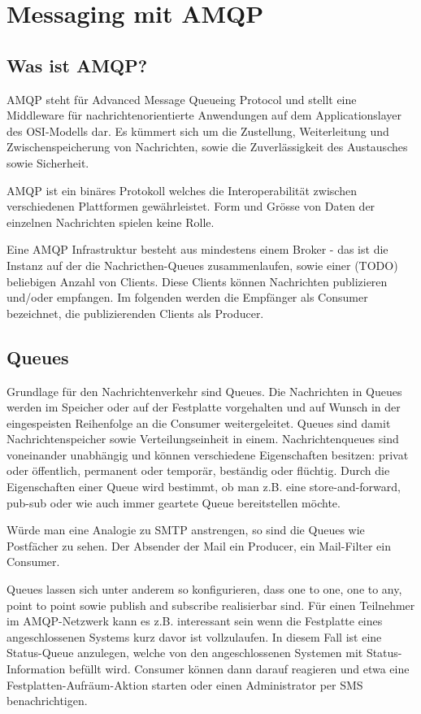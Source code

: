 \chapter{Messaging mit AMQP}

\section{Was ist AMQP?}

AMQP steht für Advanced Message Queueing Protocol und stellt eine Middleware
für nachrichtenorientierte Anwendungen auf dem Applicationslayer des OSI-Modells
dar. Es kümmert sich um die Zustellung, Weiterleitung und Zwischenspeicherung von
Nachrichten, sowie die Zuverlässigkeit des Austausches sowie Sicherheit.

AMQP ist ein binäres Protokoll welches die Interoperabilität zwischen verschiedenen
Plattformen gewährleistet. Form und Grösse von Daten der einzelnen Nachrichten
spielen keine Rolle.

Eine AMQP Infrastruktur besteht aus mindestens einem Broker - das ist die
Instanz auf der die Nachricthen-Queues zusammenlaufen, sowie einer (TODO) beliebigen
Anzahl von Clients. Diese Clients können Nachrichten publizieren und/oder
empfangen. Im folgenden werden die Empfänger als Consumer bezeichnet, die
publizierenden Clients als Producer.


\section{Queues}

Grundlage für den Nachrichtenverkehr sind Queues. Die Nachrichten in Queues
werden im Speicher oder auf der Festplatte vorgehalten und auf Wunsch in der eingespeisten
Reihenfolge an die Consumer weitergeleitet. Queues sind damit Nachrichtenspeicher
sowie Verteilungseinheit in einem. Nachrichtenqueues sind voneinander
unabhängig und können verschiedene Eigenschaften besitzen: privat oder öffentlich,
permanent oder temporär, beständig oder flüchtig. Durch die Eigenschaften
einer Queue wird bestimmt, ob man z.B. eine store-and-forward, pub-sub oder
wie auch immer geartete Queue bereitstellen möchte.

Würde man eine Analogie zu SMTP anstrengen, so sind die Queues wie Postfächer
zu sehen. Der Absender der Mail ein Producer, ein Mail-Filter ein Consumer.

Queues lassen sich unter anderem so konfigurieren, dass one to one, one to any,
point to point sowie publish and subscribe realisierbar sind. Für einen
Teilnehmer im AMQP-Netzwerk kann es z.B. interessant sein wenn die Festplatte
eines angeschlossenen Systems kurz davor ist vollzulaufen. In diesem Fall
ist eine Status-Queue anzulegen, welche von den angeschlossenen Systemen
mit Status-Information befüllt wird. Consumer können dann darauf reagieren
und etwa eine Festplatten-Aufräum-Aktion starten oder einen Administrator
per SMS benachrichtigen.

